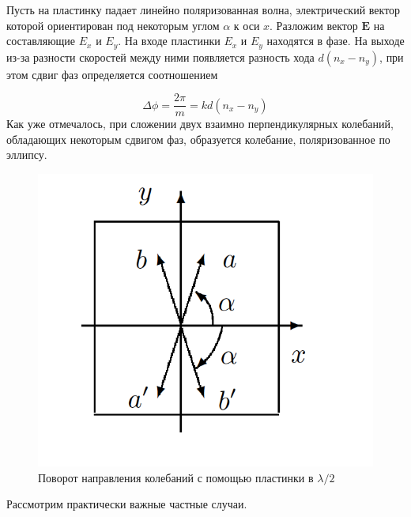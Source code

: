 \documentclass[a4paper, 12pt]{article}%
\begin{document}
Пусть на пластинку падает линейно поляризованная волна, электрический вектор которой ориентирован под некоторым углом $ \alpha $ к оси
$ x $. Разложим вектор $ \mathbf{E} $ на составляющие $ E_x $ и $ E_y $. На входе пластинки $ E_x $ и $ E_y $ находятся в фазе. На выходе из-за разности скоростей между ними появляется разность хода $ d(n_x - n_y) $, при этом сдвиг фаз определяется соотношением

\begin{equation}\label{}
\Delta \phi =  \dfrac{2\pi}{m} = k d(n_x - n_y)
\end{equation}
Как уже отмечалось, при сложении двух взаимно перпендикулярных колебаний, обладающих некоторым сдвигом фаз, образуется колебание, поляризованное по эллипсу.

\begin{figure}
	\includegraphics[width=\linewidth]{images/2.png}
	\caption{Поворот направления колебаний с помощью пластинки в $ \lambda / 2 $}
	\label{ris 2}
\end{figure}


Рассмотрим практически важные частные случаи.
\end{document}
